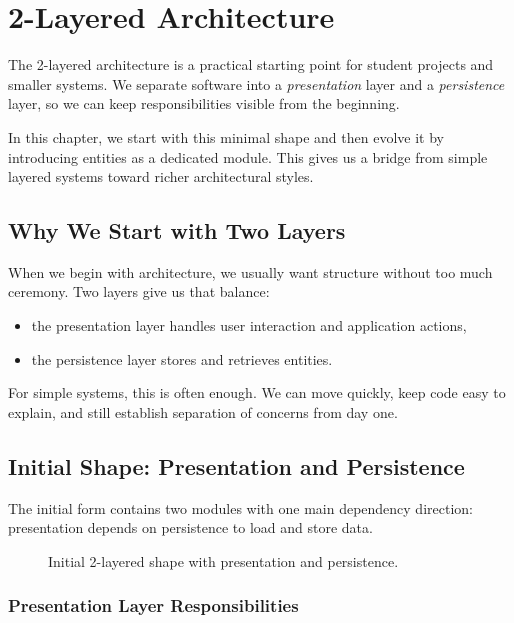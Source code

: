\chapter{2-Layered Architecture}
\label{ch:2_layered}

The 2-layered architecture is a practical starting point for student projects and smaller systems. We separate software into a \textit{presentation} layer and a \textit{persistence} layer, so we can keep responsibilities visible from the beginning.

In this chapter, we start with this minimal shape and then evolve it by introducing entities as a dedicated module. This gives us a bridge from simple layered systems toward richer architectural styles.

\section{Why We Start with Two Layers}
\label{sec:2_layered_why}

When we begin with architecture, we usually want structure without too much ceremony. Two layers give us that balance:
\begin{itemize}
    \item the presentation layer handles user interaction and application actions,
    \item the persistence layer stores and retrieves entities.
\end{itemize}

For simple systems, this is often enough. We can move quickly, keep code easy to explain, and still establish separation of concerns from day one.

\section{Initial Shape: Presentation and Persistence}
\label{sec:2_layered_initial_shape}

The initial form contains two modules with one main dependency direction: presentation depends on persistence to load and store data.

\begin{figure}[htbp]
    \centering
    
    \caption{Initial 2-layered shape with presentation and persistence.}
    \label{fig:2_layered_initial_shape}
\end{figure}

\subsection{Presentation Layer Responsibilities}
\label{sec:2_layered_presentation_responsibilities}

